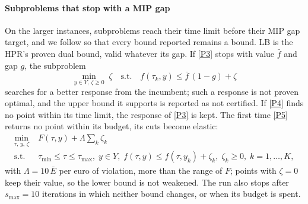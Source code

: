 \documentclass[review,11pt,nonatbib]{elsarticle}
\theoremstyle{remark}
\newcommand{\tmin}{\tau_{\min}}
\newcommand{\tmax}{\tau_{\max}}
\newcommand{\Ebar}{\bar{E}}
\begin{document}
\paragraph{Subproblems that stop with a MIP gap} On the larger instances, subproblems reach their time limit before their MIP gap target, and we follow \textcite[Section~7]{soares2021deterministic} so that every bound reported remains a bound. LB is the HPR's proven dual bound, valid whatever its gap. If \eqref{P3} stops with value $\bar f$ and gap $g$, the subproblem
\begin{equation}
\min_{y \in Y,\, \zeta \ge 0} \; \zeta \quad \text{s.t.} \quad f(\tau_k, y) \le \bar f\,(1 - g) + \zeta \tag{P6}\label{P6}
\end{equation}
searches for a better response from the incumbent; such a response is not proven optimal, and the upper bound it supports is reported as not certified. If \eqref{P4} finds no point within its time limit, the response of \eqref{P3} is kept. The first time \eqref{P5} returns no point within its budget, its cuts become elastic:
\begin{equation}
\begin{aligned}
\min_{\tau,\, y,\, \zeta} \; & F(\tau, y) + \Lambda \textstyle\sum_{k} \zeta_k \\
\text{s.t.} \; & \tmin \le \tau \le \tmax, \; y \in Y, \; f(\tau, y) \le f(\tau, y_k) + \zeta_k, \; \zeta_k \ge 0, \; k = 1, \dots, K,
\end{aligned} \tag{P5-D}\label{P5D}
\end{equation}
with $\Lambda = 10\,\Ebar$ per euro of violation, more than the range of $F$; points with $\zeta = 0$ keep their value, so the lower bound is not weakened. The run also stops after $s_{\max} = 10$ iterations in which neither bound changes, or when its budget is spent.
\end{document}
